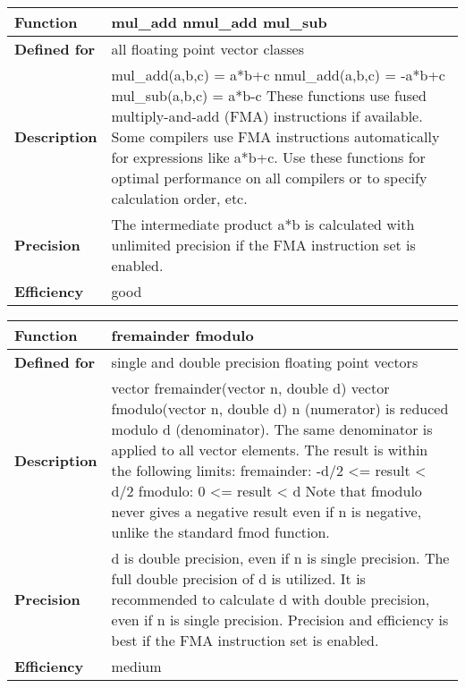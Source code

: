 \documentclass[vcl_manual.tex]{subfiles}
\begin{document}
\begin{tabular}{|p{25mm}|p{100mm}|}
\hline
\bfseries Function & mul\_add \newline
nmul\_add \newline
mul\_sub \\ \hline
\bfseries Defined for & all floating point vector classes \\ \hline
\bfseries Description & mul\_add(a,b,c) = a*b+c \newline
nmul\_add(a,b,c) = -a*b+c \newline
mul\_sub(a,b,c) = a*b-c \newline
These functions use fused multiply-and-add (FMA) instructions if available. Some compilers use FMA instructions automatically for expressions like a*b+c. Use these functions for optimal performance on all compilers or to specify calculation order, etc. \\ \hline
\bfseries Precision & The intermediate product a*b is calculated with unlimited precision if the FMA instruction set is enabled. \\ \hline
\bfseries Efficiency & good \\ \hline
\end{tabular}


\begin{tabular}{|p{25mm}|p{100mm}|}
\hline
\bfseries Function & fremainder \newline
fmodulo \\ \hline
\bfseries Defined for & single and double precision floating point vectors \\ \hline
\bfseries Description & 
vector fremainder(vector n, double d) \newline
vector fmodulo(vector n, double d) \newline
n (numerator) is reduced modulo d (denominator). \newline
The same denominator is applied to all vector elements. \newline
The result is within the following limits: \newline
fremainder: -d/2 <= result < d/2 \newline
fmodulo: 0 <= result < d \newline
Note that fmodulo never gives a negative result even if n is negative, unlike the standard fmod function. \\ \hline
\bfseries Precision & d is double precision, even if n is single precision. 
The full double precision of d is utilized. It is recommended to calculate
d with double precision, even if n is single precision. \newline
Precision and efficiency is best if the FMA instruction set is enabled. \\ \hline
\bfseries Efficiency & medium \\ \hline
\end{tabular}
\end{document}
